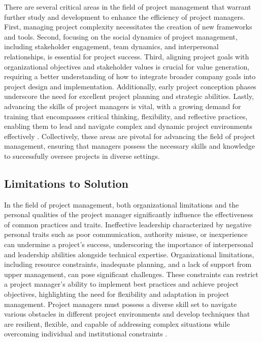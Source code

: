 \documentclass{article}
\begin{document}
There are several critical areas in the field of project management that warrant further study and development to enhance the efficiency of project managers. First, managing project complexity necessitates the creation of new frameworks and tools. Second, focusing on the social dynamics of project management, including stakeholder engagement, team dynamics, and interpersonal relationships, is essential for project success. Third, aligning project goals with organizational objectives and stakeholder values is crucial for value generation, requiring a better understanding of how to integrate broader company goals into project design and implementation. Additionally, early project conception phases underscore the need for excellent project planning and strategic abilities. Lastly, advancing the skills of project managers is vital, with a growing demand for training that encompasses critical thinking, flexibility, and reflective practices, enabling them to lead and navigate complex and dynamic project environments effectively \cite{winter2006directions}. Collectively, these areas are pivotal for advancing the field of project management, ensuring that managers possess the necessary skills and knowledge to successfully oversee projects in diverse settings.


\subsection{Limitations to Solution}

In the field of project management, both organizational limitations and the personal qualities of the project manager significantly influence the effectiveness of common practices and traits. Ineffective leadership characterized by negative personal traits such as poor communication, authority misuse, or inexperience can undermine a project's success, underscoring the importance of interpersonal and leadership abilities alongside technical expertise. Organizational limitations, including resource constraints, inadequate planning, and a lack of support from upper management, can pose significant challenges. These constraints can restrict a project manager's ability to implement best practices and achieve project objectives, highlighting the need for flexibility and adaptation in project management. Project managers must possess a diverse skill set to navigate various obstacles in different project environments and develop techniques that are resilient, flexible, and capable of addressing complex situations while overcoming individual and institutional constraints \cite{toor2009ineffective}.
\end{document}
